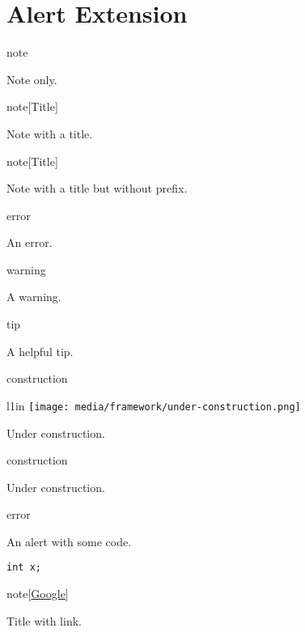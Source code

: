 
\chapter{\label{alert-extension}Alert Extension}
\begin{alert}[note]{note}

\par Note only.
\end{alert}

\begin{alert}[note]{note}[Title]

\par Note with a title.
\end{alert}

\begin{alert}[]{note}[Title]

\par Note with a title but without prefix.
\end{alert}

\begin{alert}[error]{error}

\par An error.
\end{alert}

\begin{alert}[warning]{warning}

\par A warning.
\end{alert}

\begin{alert}[tip]{tip}

\par A helpful tip.
\end{alert}
\begin{alert}[construction]{construction}

\begin{wrapfigure}{l}{1in}
\texttt{[image: media/framework/under-construction.png]}
\end{wrapfigure}

\par Under construction.
\end{alert}
\begin{alert}[construction]{construction}

\par Under construction.
\end{alert}

\begin{alert}[error]{error}

\par An alert with some code.
\begin{verbatim}
int x;
\end{verbatim}

\end{alert}

\begin{alert}[note]{note}[\href{https://google.com}{Google}]

\par Title with link.
\end{alert}
